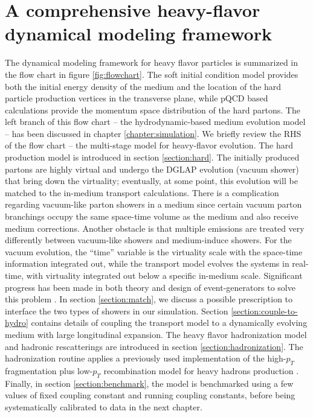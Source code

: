 \chapter{A comprehensive heavy-flavor dynamical modeling framework}
\label{chapter:coupling}
The dynamical modeling framework for heavy flavor particles is summarized in the flow chart in figure \ref{fig:flowchart}.
The soft initial condition model provides both the initial energy density of the medium and the location of the hard particle production vertices in the transverse plane, while pQCD based calculations provide the momentum space distribution of the hard partons.
The left branch of this flow chart -- the hydrodynamic-based medium evolution model -- has been discussed in chapter \ref{chapter:simulation}.
We briefly review the RHS of the flow chart -- the multi-stage model for heavy-flavor evolution.
The hard production model is introduced in section \ref{section:hard}.
The initially produced partons are highly virtual and undergo the DGLAP evolution (vacuum shower) that bring down the virtuality; eventually, at some point, this evolution will be matched to the in-medium transport calculations.
There is a complication regarding vacuum-like parton showers in a medium since certain vacuum parton branchings occupy the same space-time volume as the medium and also receive medium corrections.
Another obstacle is that multiple emissions are treated very differently between vacuum-like showers and medium-induce showers.
For the vacuum evolution, the ``time'' variable is the virtuality scale with the space-time information integrated out, while the transport model evolves the systems in real-time, with virtuality integrated out below a specific in-medium scale.
Significant progress has been made in both theory and design of event-generators to solve this problem \cite{MehtarTani:2012cy,Mehtar-Tani:2017ypq,Cao:2017zih,Kauder:2018cdt,Putschke:2019yrg,PhysRevLett.120.232001,Caucal:2018ofz}.
In section \ref{section:match}, we discuss a possible prescription to interface the two types of showers in our simulation.
Section \ref{section:couple-to-hydro} contains details of coupling the transport model to a dynamically evolving medium with large longitudinal expansion.
The heavy flavor hadronization model and hadronic rescatterings are introduced in section \ref{section:hadronization}.
The hadronization routine applies a previously used implementation \cite{Cao:2013ita} of the high-$p_T$ fragmentation plus low-$p_T$ recombination model for heavy hadrons production \cite{Oh:2009zj}.
Finally, in section \ref{section:benchmark}, the model is benchmarked using a few values of fixed coupling constant and running coupling constants, before being systematically calibrated to data in the next chapter.

